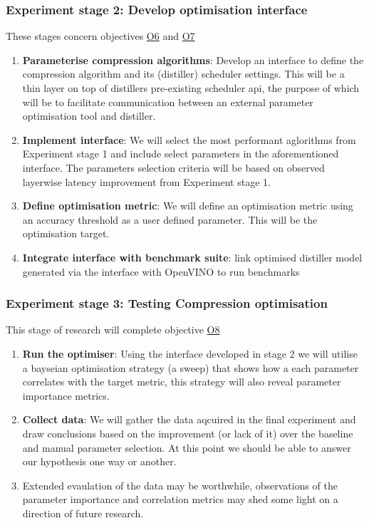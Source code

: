 \documentclass[../D1.tex]{subfiles}
\begin{document}
\subsubsection{Experiment stage 2: Develop optimisation interface}\label{sec:Experiment2}
These stages concern objectives \hyperref[obj:ParaSel]{O6} and \hyperref[obj:CompPara]{O7}
\begin{enumerate}
    \item \textbf{Parameterise compression algorithms}: Develop an interface to define the compression algorithm and its (distiller) scheduler settings. This will be a thin layer on top of distillers pre-existing scheduler api, the purpose of which will be to facilitate communication between an external parameter optimisation tool and distiller.
    \item \textbf{Implement interface}: We will select the most performant aglorithms from Experiment stage 1 and include select parameters in the aforementioned interface. The parameters selection criteria will be based on observed layerwise latency improvement from Experiment stage 1.
    \item \textbf{Define optimisation metric}: We will define an optimisation metric using an accuracy threshold as a user defined parameter. This will be the optimisation target.
    \item \textbf{Integrate interface with benchmark suite}: link optimised distiller model generated via the interface with OpenVINO to run benchmarks
\end{enumerate}

\subsubsection{Experiment stage 3: Testing Compression optimisation}\label{sec:Experiment3}
This stage of research will complete objective \hyperref[obj:TestOpt]{O8}
\begin{enumerate}
    \item \textbf{Run the optimiser}: Using the interface developed in stage 2 we will utilise a bayseian optimisation strategy (a sweep) that shows how a each parameter correlates with the target metric, this strategy will also reveal parameter importance metrics.
    \item \textbf{Collect data}: We will gather the data aqcuired in the final experiment and draw conclusions based on the improvement (or lack of it) over the baseline and manual parameter selection. At this point we should be able to answer our hypothesis one way or another.
    \item Extended evaulation of the data may be worthwhile, observations of the parameter importance and correlation metrics may shed some light on a direction of future research.
\end{enumerate}
\end{document}
